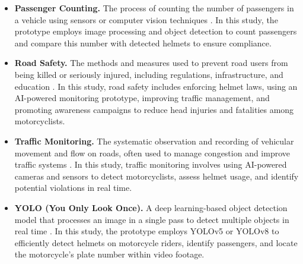 \begin{refsection}
\begin{itemize}
    \item \textbf{Passenger Counting.} The process of counting the number of passengers in a vehicle using sensors or computer vision techniques \cite{Kim2022}. In this study, the prototype employs image processing and object detection to count passengers and compare this number with detected helmets to ensure compliance.


    \item \textbf{Road Safety.} The methods and measures used to prevent road users from being killed or seriously injured, including regulations, infrastructure, and education \cite{OxfordRef}. In this study, road safety includes enforcing helmet laws, using an AI-powered monitoring prototype, improving traffic management, and promoting awareness campaigns to reduce head injuries and fatalities among motorcyclists.


    \item \textbf{Traffic Monitoring.} The systematic observation and recording of vehicular movement and flow on roads, often used to manage congestion and improve traffic systems \cite{BritannicaTraffic}. In this study, traffic monitoring involves using AI-powered cameras and sensors to detect motorcyclists, assess helmet usage, and identify potential violations in real time.


    \item \textbf{YOLO (You Only Look Once).} A deep learning-based object detection model that processes an image in a single pass to detect multiple objects in real time \cite{Redmon2020}. In this study, the prototype employs YOLOv5 or YOLOv8 to efficiently detect helmets on motorcycle riders, identify passengers, and locate the motorcycle’s plate number within video footage.
\end{itemize}




\clearpage
\printbibliography[heading=subbibintoc, title={\texorpdfstring{\centering}{} Notes}]
\end{refsection}

